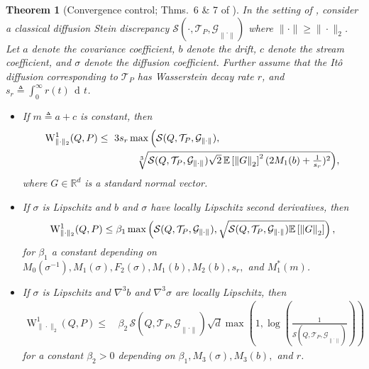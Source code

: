 \documentclass[12pt,paper=letter]{scrreprt}
\newtheorem{theorem}{Theorem}[chapter]
\newcommand{\dee}{\mathop{\mathrm{d}\!}}
\newcommand{\dt}{\,\dee t}
\def\Ito{It\^o\xspace}
\def\mbb#1{\mathbb{#1}}
\def\reals{\mathbb{R}} %
\def\defeq{\triangleq} %
\def\norm#1{\left\|{#1}\right\|} %
\newcommand{\twonorm}[1]{\norm{#1}_2} %
\def\E{\mbb{E}} %
\def\Earg#1{\E\left[{#1}\right]}
\newcommand{\grad}{\nabla} %
\newcommand{\gset}[0]{\mathcal{G}} %
\newcommand{\steinset}[0]{\steinsetarg{}} %
\newcommand{\steinsetarg}[1]{\gset_{\norm{\cdot}_{#1}}} %
\newcommand{\sr}{s_r} %
\begin{document}
\begin{theorem}[Convergence control; Thms.~6 \& 7 of \citealp{Gorham2019}]
\label{thm:constant-lower-bound}
In the setting of , consider a classical diffusion Stein discrepancy $\mathcal{S}(\cdot,\mathcal{T}_P,\steinset)$ where $\|\cdot\| \geq \| \cdot \|_2$.
Let $a$ denote the covariance coefficient, $b$ denote the drift, $c$ denote the stream coefficient, and $\sigma$ denote the diffusion coefficient.
Further assume that the \Ito diffusion corresponding to $\mathcal{T}_P$ has Wasserstein decay rate $r$, and $\sr \defeq \int_0^\infty r(t)\dt$.
\begin{itemize}[leftmargin=*]
    \item If $m \defeq a + c$ is constant, then 
\begin{align}\label{eqn:stein-discrepancy-constant}
\mathrm{W}_{\|\cdot\|_2}^1(Q,P) & \leq\  3\sr \max\Big( \mathcal{S}(Q,\mathcal{T}_P,\steinset) , \\
& \hspace{40pt} \textstyle \sqrt[3]{\mathcal{S}(Q,\mathcal{T}_P,\steinset) \sqrt{2}\,\Earg{\twonorm{G}}^{2}(2M_1(b)+\frac{1}{\sr})^2} \Big), \notag
\end{align}
where 
$G \in \reals^d$ is a standard normal vector.

\item If $\sigma$ is Lipschitz and $b$ and $\sigma$ have locally Lipschitz second derivatives, then 
\begin{align*}%
\mathrm{W}_{\|\cdot\|_2}^1(Q,P) 
	\le \beta_1 \max\left(\mathcal{S}(Q,\mathcal{T}_P,\steinset), \sqrt{\mathcal{S}(Q,\mathcal{T}_P,\steinset) \Earg{\twonorm{G}} }\right), \notag
\end{align*}
for $\beta_1$ a constant depending on 
$M_0(\sigma^{-1}), M_1(\sigma),  F_2(\sigma), M_1(b), M_2(b), s_r,$
and $M_1^*(m)$.

\item If $\sigma$ is Lipschitz and $\grad^3b$ and $\grad^3\sigma$ are locally Lipschitz, then
\begin{align*}
\nonumber \mathrm{W}_{\|\cdot\|_2}^1(Q,P)\leq\, & \beta_2\, \mathcal{S}(Q,\mathcal{T}_P,\steinset)
\sqrt{d}\max\left( 1, \log\left(\frac{1}{\mathcal{S}(Q,\mathcal{T}_P,\steinset)} \right) \right) %
\end{align*}
for a constant $\beta_2 > 0$ depending on $\beta_1, M_{3}(\sigma), M_{3}(b),$ and $r$.
\end{itemize}
\end{theorem}
\end{document}

